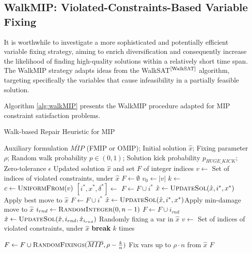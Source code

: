 \subsection{WalkMIP: Violated-Constraints-Based Variable Fixing}

It is worthwhile to investigate a more sophisticated and potentially efficient variable fixing strategy, aiming to enrich diversification and consequently increase the likelihood of finding high-quality solutions within a relatively short time span. The WalkMIP strategy adapts ideas from the WalkSAT$^\text{\cite{WalkSAT}}$ algorithm, targeting specifically the variables that cause infeasibility in a partially feasible solution. 

Algorithm \ref{alg:walkMIP} presents the WalkMIP procedure adapted for MIP constraint satisfaction problems.

\begin{algorithm}[htbp]
\caption{Walk-based Repair Heuristic for MIP}\label{alg:walkMIP}
\begin{algorithmic}[1]
\Require Auxiliary formulation $\overline{MIP}$ (FMIP or OMIP); Initial solution $\hat{x}$; Fixing parameter $\rho$; Random walk probability $p \in (0,1)$; Solution kick probability $p_{HUGE\_KICK}$; Zero-tolerance $\epsilon$
\Ensure Updated solution $\hat{x}$ and set $F$ of integer indices
    \State $v \gets$ Set of indices of violated constraints, under $\hat{x}$
    \State $F \gets \emptyset$
     $v_0 \gets |v|$\EndIf
     \Return \EndIf
        \State \Return {}
    \EndIf
    \State $k \gets $
    \Repeat
        \State $c \gets \Call{UniformFrom}{v}$
        \State $[i^*, x^*, \delta^*] \gets$ 
        \If{$\delta^* \leq -\epsilon$}
            \State $F \gets F \cup i^*$
            \State $\hat{x} \gets \Call{UpdateSol}{\hat{x},i^*,x^*}$\Comment Apply best move to $\hat{x}$
            \State $F \gets F \cup i^*$
            \State $\hat{x} \gets \Call{UpdateSol}{\hat{x},i^*,x^*}$\Comment Apply min-damage move to $\hat{x}$
        \Else 
            \State $i_{rnd} \gets \Call{RandomInteger}{0,n-1}$
            \State $F \gets F \cup i_{rnd}$
            \State $\hat{x} \gets \Call{UpdateSol}{\hat{x}, i_{rnd},\hat{x}_{i_{rnd}}}$ \Comment Randomly fixing a var in $\hat{x}$
        \EndIf
        \State $v \gets$ Set of indices of violated constraints, under $\hat{x}$
         \textbf{break} \EndIf
    \Until $k$ times

        \State $F \gets  F\cup \Call{RandomFixings}{\overline{MIP},\rho- {k\over{n}}}$ \Comment Fix vars up to $\rho \cdot n$ from $\hat{x}$
    \EndIf
    \State \Return $F$
\EndFunction
\end{algorithmic}
\end{algorithm}

